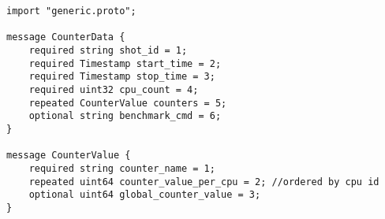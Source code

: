\begin{verbatim}
import "generic.proto";

message CounterData {
    required string shot_id = 1;
    required Timestamp start_time = 2;
    required Timestamp stop_time = 3;
    required uint32 cpu_count = 4;
    repeated CounterValue counters = 5;
    optional string benchmark_cmd = 6;
}

message CounterValue {
    required string counter_name = 1;
    repeated uint64 counter_value_per_cpu = 2; //ordered by cpu id
    optional uint64 global_counter_value = 3;
}
\end{verbatim}
